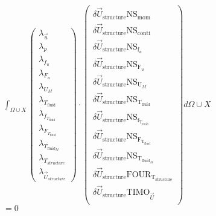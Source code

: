 \documentclass[10pt]{article} %
\begin{document}
\begin{center}
	$\int_{\Omega \cup X}
	\begin{pmatrix}
		\lambda_{\vec{u}} \\ \lambda_p \\ \lambda_{f_u} \\ \lambda_{F_u} \\ \lambda_{U_M}\\ \lambda_{T_{\text{fluid}}} \\ \lambda_{f_{T_{\text{fluid}}}} \\ \lambda_{F_{T_{\text{fluid}}}} \\ \lambda_{T_{\text{fluid}_M}} \\ \lambda_{T_{structure}} \\ \lambda_{\vec{U}_{structure}}
	\end{pmatrix}
	\cdot
	\begin{pmatrix}
		\delta \vec{U}_{\text{structure}} \text{NS}_{\text{mom}} \\
		\delta \vec{U}_{\text{structure}} \text{NS}_{\text{conti}}\\
		\delta \vec{U}_{\text{structure}} \text{NS}_{\text{f}_u} \\
		\delta \vec{U}_{\text{structure}} \text{NS}_{\text{F}_u} \\
		\delta \vec{U}_{\text{structure}} \text{NS}_{\text{U}_M} \\
		\delta \vec{U}_{\text{structure}} \text{NS}_{\text{T}_{\text{fluid}}} \\
		\delta \vec{U}_{\text{structure}} \text{NS}_{\text{f}_{\text{T}_{\text{fluid}}}}\\
		\delta \vec{U}_{\text{structure}} \text{NS}_{\text{F}_{\text{T}_{\text{fluid}}}}\\
		\delta \vec{U}_{\text{structure}} \text{NS}_{\text{T}_{\text{fluid}_M}}\\
		\delta \vec{U}_{\text{structure}} \text{FOUR}_{\text{T}_{\text{structure}}}\\
		\delta \vec{U}_{\text{structure}} \text{TIMO}_{\vec{U}}\\
	\end{pmatrix}
	d\Omega \cup X $\\
	
	$=0$\\
	
	\newpage
	

\end{center}
\end{document}
